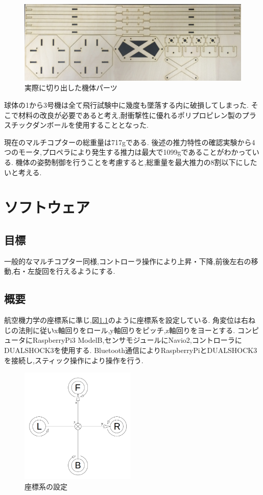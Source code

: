 \documentclass[12pt,oneside]{sotsuken_paper}
\begin{document}
\begin{figure}[htbp]
	\begin{center}
		\includegraphics[width=120mm]{image/drone/cut.jpg}
		\caption{実際に切り出した機体パーツ}
		\label{fig:cut}
	\end{center}
\end{figure}

球体の1から3号機は全て飛行試験中に幾度も墜落する内に破損してしまった.
そこで材料の改良が必要であると考え,耐衝撃性に優れるポリプロピレン製のプラスチックダンボールを使用することとなった.

現在のマルチコプターの総重量は717gである.
後述の推力特性の確認実験から4つのモータ,プロペラにより発生する推力は最大で1099gであることがわかっている.
機体の姿勢制御を行うことを考慮すると,総重量を最大推力の8割以下にしたいと考える. %


\chapter{ソフトウェア}

\section{目標}
一般的なマルチコプター同様,コントローラ操作により上昇・下降,前後左右の移動,右・左旋回を行えるようにする.

\section{概要}
航空機力学の座標系\cite{config}に準じ,図\ref{fig:config}のように座標系を設定している.
角変位は右ねじの法則に従いx軸回りをロール,y軸回りをピッチ,z軸回りをヨーとする.
コンピュータにRaspberryPi3 ModelB,センサモジュールにNavio2,コントローラにDUALSHOCK3を使用する.
Bluetooth通信によりRaspberryPiとDUALSHOCK3を接続し,スティック操作により操作を行う.

\begin{figure}[htbp]
	\begin{center}
		\includegraphics[width=55mm]{image/config.png}
		\caption{座標系の設定}
		\label{fig:config}
	\end{center}
\end{figure}
\end{document}
